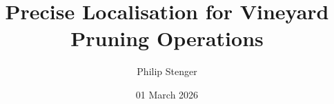 \documentclass[oneside,openany]{electhesis}
\begin{document}


\title{Precise Localisation for Vineyard Pruning Operations}
\author{Philip Stenger}
\date{01 March 2026}

\frontmatter

\maketitle



\tableofcontents









\mainmatter












\backmatter
\appendix

\end{document}
